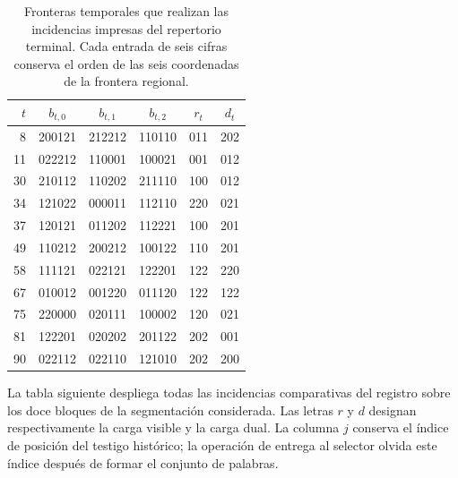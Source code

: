 \begin{table}[htbp]
\centering\small
\begin{tabular}{rccc cc}
\toprule
$t$&$b_{t,0}$&$b_{t,1}$&$b_{t,2}$&$r_t$&$d_t$\\
\midrule
8 &200121&212212&110110&011&202\\
11&022212&110001&100021&001&012\\
30&210112&110202&211110&100&012\\
34&121022&000011&112110&220&021\\
37&120121&011202&112221&100&201\\
49&110212&200212&100122&110&201\\
58&111121&022121&122201&122&220\\
67&010012&001220&011120&122&122\\
75&220000&020111&100002&120&021\\
81&122201&020202&201122&202&001\\
90&022112&022110&121010&202&200\\
\bottomrule
\end{tabular}
\caption{Fronteras temporales que realizan las incidencias impresas del
repertorio terminal. Cada entrada de seis cifras conserva el orden de
las seis coordenadas de la frontera regional.}
\label{tab:terminal-bandas-testigo}
\end{table}

La tabla siguiente despliega todas las incidencias comparativas del
registro sobre los doce bloques de la segmentación considerada. Las
letras $r$ y $d$ designan respectivamente la carga visible y la carga
dual. La columna $j$ conserva el índice de posición del testigo histórico;
la operación de entrega al selector olvida este índice después de formar
el conjunto de palabras.

